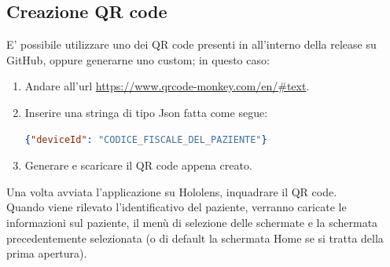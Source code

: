 \subsection{Creazione QR code}
    E' possibile utilizzare uno dei QR code presenti in all'interno della release su GitHub, oppure generarne uno custom; in questo caso:
    \begin{enumerate}
        \item Andare all'url \url{https://www.qrcode-monkey.com/en/#text}.
        \item Inserire una stringa di tipo Json fatta come segue:
        \begin{lstlisting}[language=json, firstnumber=1]
{"deviceId": "CODICE_FISCALE_DEL_PAZIENTE"}
        \end{lstlisting}
        \item Generare e scaricare il QR code appena creato.
    \end{enumerate}

Una volta avviata l'applicazione su Hololens, inquadrare il QR code. \\
\newline Quando viene rilevato l'identificativo del paziente, verranno caricate le informazioni sul paziente, il menù di selezione delle schermate e la schermata precedentemente selezionata (o di default la schermata Home se si tratta della prima apertura).
